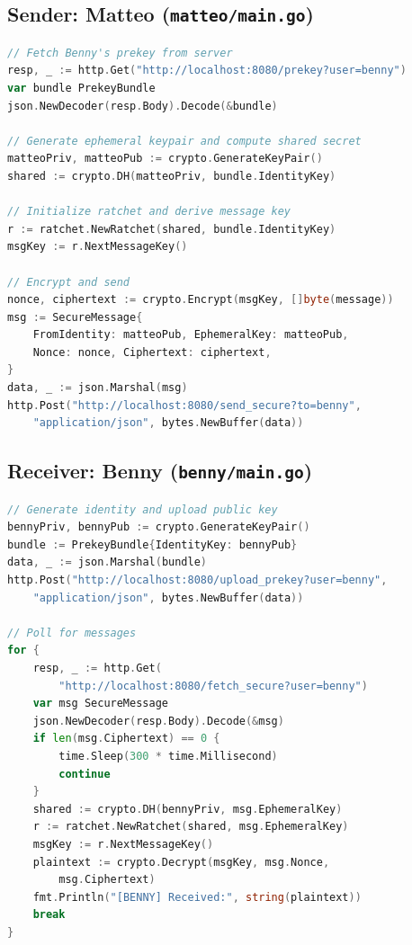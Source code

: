 \documentclass[12pt,a4paper]{article}
\begin{document}
\subsection{Sender: Matteo (\texttt{matteo/main.go})}

\begin{lstlisting}[language=Go, caption={Core sending logic (simplified).}]
// Fetch Benny's prekey from server
resp, _ := http.Get("http://localhost:8080/prekey?user=benny")
var bundle PrekeyBundle
json.NewDecoder(resp.Body).Decode(&bundle)

// Generate ephemeral keypair and compute shared secret
matteoPriv, matteoPub := crypto.GenerateKeyPair()
shared := crypto.DH(matteoPriv, bundle.IdentityKey)

// Initialize ratchet and derive message key
r := ratchet.NewRatchet(shared, bundle.IdentityKey)
msgKey := r.NextMessageKey()

// Encrypt and send
nonce, ciphertext := crypto.Encrypt(msgKey, []byte(message))
msg := SecureMessage{
    FromIdentity: matteoPub, EphemeralKey: matteoPub,
    Nonce: nonce, Ciphertext: ciphertext,
}
data, _ := json.Marshal(msg)
http.Post("http://localhost:8080/send_secure?to=benny",
    "application/json", bytes.NewBuffer(data))
\end{lstlisting}

\subsection{Receiver: Benny (\texttt{benny/main.go})}

\begin{lstlisting}[language=Go, caption={Core receiving logic (simplified).}]
// Generate identity and upload public key
bennyPriv, bennyPub := crypto.GenerateKeyPair()
bundle := PrekeyBundle{IdentityKey: bennyPub}
data, _ := json.Marshal(bundle)
http.Post("http://localhost:8080/upload_prekey?user=benny",
    "application/json", bytes.NewBuffer(data))

// Poll for messages
for {
    resp, _ := http.Get(
        "http://localhost:8080/fetch_secure?user=benny")
    var msg SecureMessage
    json.NewDecoder(resp.Body).Decode(&msg)
    if len(msg.Ciphertext) == 0 {
        time.Sleep(300 * time.Millisecond)
        continue
    }
    shared := crypto.DH(bennyPriv, msg.EphemeralKey)
    r := ratchet.NewRatchet(shared, msg.EphemeralKey)
    msgKey := r.NextMessageKey()
    plaintext := crypto.Decrypt(msgKey, msg.Nonce,
        msg.Ciphertext)
    fmt.Println("[BENNY] Received:", string(plaintext))
    break
}
\end{lstlisting}
\end{document}
